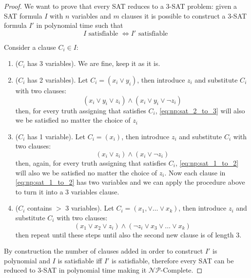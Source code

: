 \documentclass[12pt]{extarticle}
\newcommand{\NP}{{\mathcal{NP}}}
\newcommand{\NPC}{$\NP$-Complete}
\begin{document}
\begin{proof}
    We want to prove that every SAT reduces to a 3-SAT problem:
    given a SAT formula $I$ with $n$ variables and $m$ clauses it is possible to construct a 3-SAT formula $I'$ in polynomial time such that
    \begin{equation}
        I \text{ satisfiable } \iff I' \text{ satisfiable }
    \end{equation}

    Consider a clause $C_i \in I$:
    \begin{enumerate}[label=\roman*.]
        \item ($C_i$ has 3 variables). We are fine, keep it as it is.
        \item ($C_i$ has 2 variables). Let $C_i = (x_i \lor y_i)$, then introduce $z_i$ and substitute $C_i$ with two clauses:
              \begin{equation}
                  \label{eq:np:sat_2_to_3}
                  (x_i \lor y_i \lor z_i) \land (x_i \lor y_i \lor \lnot z_i)
              \end{equation}
              then, for every truth assigning that satisfies $C_i$, \autoref{eq:np:sat_2_to_3} will also we be satisfied no matter the choice of $z_i$
        \item ($C_i$ has 1 variable). Let $C_i = (x_i)$, then introduce $z_i$ and substitute $C_i$ with two clauses:
              \begin{equation}
                  \label{eq:np:sat_1_to_2}
                  (x_i \lor z_i) \land (x_i \lor \lnot z_i)
              \end{equation}
              then, again, for every truth assigning that satisfies $C_i$, \autoref{eq:np:sat_1_to_2} will also we be satisfied no matter the choice of $z_i$.
              Now each clause in \autoref{eq:np:sat_1_to_2} has two variables and we can apply the procedure above to turn it into a 3 variables clause.
        \item ($C_i$ contains $>$ 3 variables). Let $C_i = (x_1, \lor \dots \lor x_k)$, then introduce $z_i$ and substitute $C_i$ with two clauses:
              \begin{equation}
                  (x_1 \lor x_2 \lor z_i) \land (\lnot z_i \lor x_3 \lor \dots \lor x_k)
              \end{equation}
              then repeat until these steps until also the second new clause is of length 3.
    \end{enumerate}

    By construction the number of clauses added in order to construct $I'$ is polynomial and $I$ is satisfiable iff $I'$ is satisfiable,
    therefore every SAT can be reduced to 3-SAT in polynomial time making it \NPC.
\end{proof}
\end{document}

